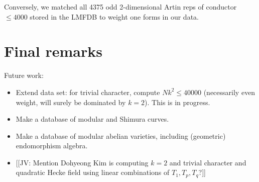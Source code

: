 \documentclass[11pt]{amsart}
\numberwithin{equation}{subsection}
\theoremstyle{plain}
\theoremstyle{definition}
\newcommand{\jv}[1]{{\color{red} \textsf{[[JV: #1]]}}}
\begin{document}
Conversely, we matched all 4375 odd 2-dimensional Artin reps of conductor $\leq 4000$ stored in the LMFDB to weight one forms in our data.

\section{Final remarks} \label{sec:conclusion}

Future work:
\begin{itemize}
\item Extend data set: for trivial character, compute $Nk^2 \leq 40000$ (necessarily even weight, will surely be dominated by $k=2$).  This is in progress.
\item Make a database of modular and Shimura curves.
\item Make a database of modular abelian varieties, including (geometric) endomorphism algebra.
\item \jv{Mention Dohyeong Kim is computing $k=2$ and trivial character and quadratic Hecke field using linear combinations of $T_1,T_p,T_q$?}
\end{itemize}
\end{document}
